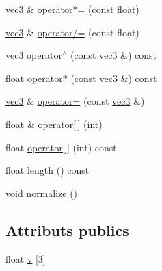 \begin{DoxyCompactItemize}
\item 
\hyperlink{structvec3}{vec3} \& \hyperlink{structvec3_adb800577653efc53821cab5c47249207}{operator$\ast$=} (const float)
\item 
\hyperlink{structvec3}{vec3} \& \hyperlink{structvec3_ae5866f35cc874c4ea7e2920163ee709f}{operator/=} (const float)
\item 
\hyperlink{structvec3}{vec3} \hyperlink{structvec3_af10f17f6dcf4cb0b63827ac5d6afa168}{operator$^\wedge$} (const \hyperlink{structvec3}{vec3} \&) const 
\item 
float \hyperlink{structvec3_aa5a0eb462a38fe9ed5ec11d127f1fe2e}{operator$\ast$} (const \hyperlink{structvec3}{vec3} \&) const 
\item 
\hyperlink{structvec3}{vec3} \& \hyperlink{structvec3_ae173f2c6d7b48905e0f2666ae8d2c575}{operator=} (const \hyperlink{structvec3}{vec3} \&)
\item 
float \& \hyperlink{structvec3_a844c40453b104e13968b06eec9b6a43e}{operator\mbox{[}$\,$\mbox{]}} (int)
\item 
float \hyperlink{structvec3_a7d8037216800e2c2ad7b72817f5057ea}{operator\mbox{[}$\,$\mbox{]}} (int) const 
\item 
float \hyperlink{structvec3_ad622150f0a08c548b062775dd5d76a41}{length} () const 
\item 
void \hyperlink{structvec3_ae3cc67c1a7a21bd1aa051a30943332c5}{normalize} ()
\end{DoxyCompactItemize}
\subsection*{Attributs publics}
\begin{DoxyCompactItemize}
\item 
float \hyperlink{structvec3_ad09608040a1a4e4d026086eff69725d2}{v} \mbox{[}3\mbox{]}
\end{DoxyCompactItemize}



